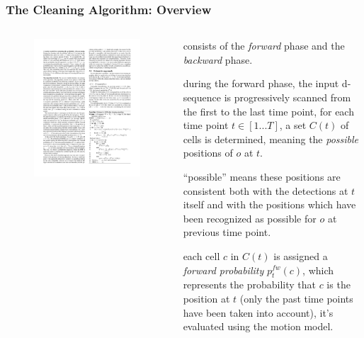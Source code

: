 \begin{frame}
\frametitle{The Cleaning Algorithm: Overview}

\begin{columns}

  \begin{figure}[tb]
    \includegraphics[width=\columnwidth]{figures/3-4/3-4-16.pdf}
  \end{figure}

  \begin{sitemize}
    \item consists of the \emph{forward} phase and the \emph{backward} phase.
    \item during the forward phase, the input d-sequence is progressively scanned from the first to the last time point, for each time point $t \in [1...T]$, a set $C(t)$ of cells is determined, meaning the \emph{possible} positions of $o$ at $t$.
    \item ``possible'' means these positions are consistent both with the detections at $t$ itself and with the positions which have been recognized as possible for $o$ at previous time point.
    \item each cell $c$ in $C(t)$ is assigned a \emph{forward probability} $p^{fw}_t(c)$, which represents the probability that $c$ is the position at $t$ (only the past time points have been taken into account), it's evaluated using the motion model.
  \end{sitemize}

\end{columns}

\end{frame}

